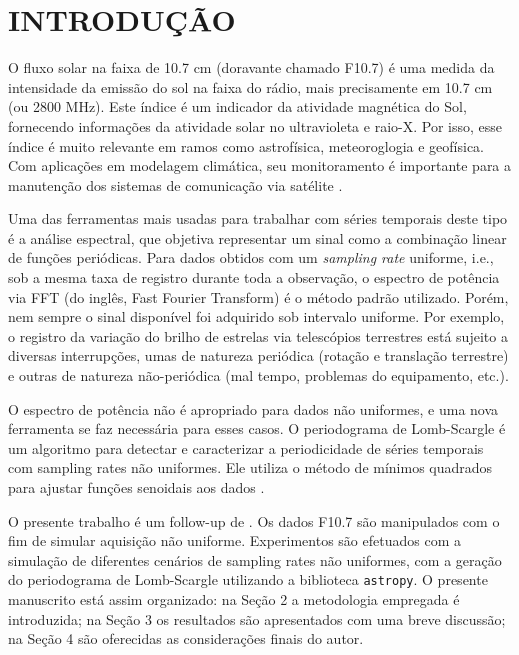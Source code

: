 
\chapter{INTRODUÇÃO}

O fluxo solar na faixa de 10.7 cm (doravante chamado F10.7) é uma medida da intensidade da emissão do sol na faixa do rádio, mais precisamente em 10.7 cm (ou 2800 MHz). Este índice é um indicador da atividade magnética do Sol, fornecendo informações da atividade solar no ultravioleta e raio-X. Por isso, esse índice é muito relevante em ramos como astrofísica, meteoroglogia e geofísica. Com aplicações em modelagem climática, seu monitoramento é importante para a manutenção dos sistemas de comunicação via satélite \cite{huang2009forecast}. 

Uma das ferramentas mais usadas para trabalhar com séries temporais deste tipo é a análise espectral, que objetiva representar um sinal como a combinação linear de funções periódicas. Para dados obtidos com um \textit{sampling rate} uniforme, i.e., sob a mesma taxa de registro durante toda a observação, o espectro de potência via FFT (do inglês, Fast Fourier Transform) é o método padrão utilizado. Porém, nem sempre o sinal disponível foi adquirido sob intervalo uniforme. Por exemplo,  o registro da variação do brilho de estrelas via telescópios terrestres está sujeito a diversas interrupções, umas de natureza periódica (rotação e translação terrestre) e outras de natureza não-periódica (mal tempo, problemas do equipamento, etc.). 

O espectro de potência não é apropriado para dados não uniformes, e uma nova ferramenta se faz necessária para esses casos. O periodograma de Lomb-Scargle \cite{lomb1976least,scargle1982studies} é um algoritmo para detectar e caracterizar a periodicidade de séries temporais com sampling rates não uniformes. Ele utiliza o método de mínimos quadrados para ajustar funções senoidais aos dados \cite{2017arXiv170309824V}. 

O presente trabalho é um follow-up de . Os dados F10.7 são manipulados com o fim de simular aquisição não uniforme. Experimentos são efetuados com a simulação de diferentes cenários de sampling rates não uniformes, com a geração do periodograma de Lomb-Scargle utilizando a biblioteca \texttt{astropy}. O presente manuscrito está assim organizado: na Seção 2 a metodologia empregada é introduzida; na Seção 3 os resultados são apresentados com uma breve discussão; na Seção 4 são oferecidas as considerações finais do autor.

